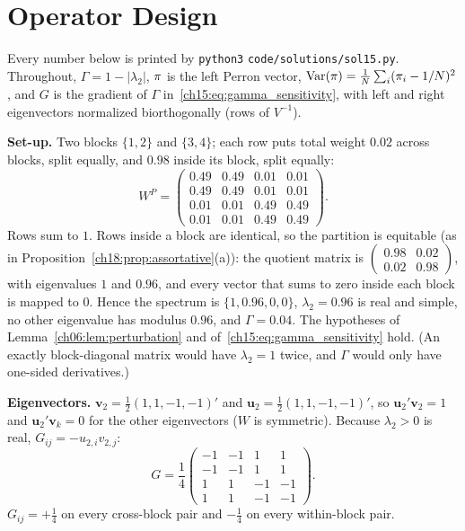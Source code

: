 \documentclass[../solutions_manual.tex]{subfiles}
\begin{document}
\begingroup\setlength{\emergencystretch}{3em}%
\ifSubfilesClassLoaded{\setcounter{chapter}{14}}{}%
\setcounter{chapter}{14}%
\chapter{Operator Design}\label{sol15}

Every number below is printed by \texttt{python3} \nolinkurl{code/solutions/sol15.py}. Throughout, $\Gamma = 1 - |\lambda_2|$, $\pi$ is the left Perron vector, $\operatorname{Var}(\pi) = \frac1N\sum_i(\pi_i - 1/N)^2$, and $G$ is the gradient of $\Gamma$ in~\eqref{ch15:eq:gamma_sensitivity}, with left and right eigenvectors normalized biorthogonally (rows of $V^{-1}$).


 \textbf{Set-up.} Two blocks $\{1,2\}$ and $\{3,4\}$; each row puts total weight $0.02$ across blocks, split equally, and $0.98$ inside its block, split equally:
\[
W^P = \begin{pmatrix} 0.49 & 0.49 & 0.01 & 0.01\\ 0.49 & 0.49 & 0.01 & 0.01\\ 0.01 & 0.01 & 0.49 & 0.49\\ 0.01 & 0.01 & 0.49 & 0.49 \end{pmatrix}.
\]
Rows sum to $1$. Rows inside a block are identical, so the partition is equitable (as in Proposition~\ref{ch18:prop:assortative}(a)): the quotient matrix is $\begin{pmatrix}0.98 & 0.02\\0.02 & 0.98\end{pmatrix}$, with eigenvalues $1$ and $0.96$, and every vector that sums to zero inside each block is mapped to $0$. Hence the spectrum is $\{1, 0.96, 0, 0\}$, $\lambda_2 = 0.96$ is real and simple, no other eigenvalue has modulus $0.96$, and $\Gamma = 0.04$. The hypotheses of Lemma~\ref{ch06:lem:perturbation} and of~\eqref{ch15:eq:gamma_sensitivity} hold. (An exactly block-diagonal matrix would have $\lambda_2 = 1$ twice, and $\Gamma$ would only have one-sided derivatives.)

\textbf{Eigenvectors.} $\mathbf{v}_2 = \frac12(1,\allowbreak 1,\allowbreak -1,\allowbreak -1)'$ and $\mathbf{u}_2 = \frac12(1,\allowbreak 1,\allowbreak -1,\allowbreak -1)'$, so $\mathbf{u}_2'\mathbf{v}_2 = 1$ and $\mathbf{u}_2'\mathbf{v}_k = 0$ for the other eigenvectors ($W$ is symmetric). Because $\lambda_2 > 0$ is real, $G_{ij} = -u_{2,i}v_{2,j}$:
\[
G = \frac14\begin{pmatrix} -1 & -1 & 1 & 1\\ -1 & -1 & 1 & 1\\ 1 & 1 & -1 & -1\\ 1 & 1 & -1 & -1 \end{pmatrix}.
\]
$G_{ij} = +\frac14$ on every cross-block pair and $-\frac14$ on every within-block pair.
\end{document}
